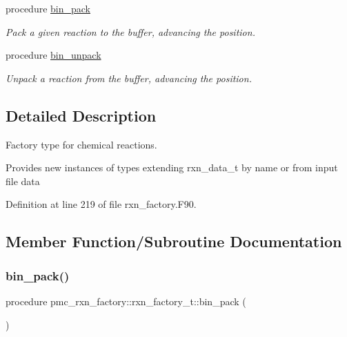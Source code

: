 \begin{DoxyCompactItemize}
procedure \mbox{\hyperlink{structpmc__rxn__factory_1_1rxn__factory__t_a72960f541acc00590ddd21511df66604}{bin\+\_\+pack}}
\begin{DoxyCompactList}\small\item\em Pack a given reaction to the buffer, advancing the position. \end{DoxyCompactList}\item 
procedure \mbox{\hyperlink{structpmc__rxn__factory_1_1rxn__factory__t_a01d9107ebd48bf470251492502354405}{bin\+\_\+unpack}}
\begin{DoxyCompactList}\small\item\em Unpack a reaction from the buffer, advancing the position. \end{DoxyCompactList}\end{DoxyCompactItemize}


\subsection{Detailed Description}
Factory type for chemical reactions. 

Provides new instances of types extending rxn\+\_\+data\+\_\+t by name or from input file data 

Definition at line 219 of file rxn\+\_\+factory.\+F90.



\subsection{Member Function/\+Subroutine Documentation}
\mbox{\label{structpmc__rxn__factory_1_1rxn__factory__t_a72960f541acc00590ddd21511df66604}} 
\subsubsection{\texorpdfstring{bin\+\_\+pack()}{bin\_pack()}}
{\footnotesize\ttfamily procedure pmc\+\_\+rxn\+\_\+factory\+::rxn\+\_\+factory\+\_\+t\+::bin\+\_\+pack (\begin{DoxyParamCaption}{ }\end{DoxyParamCaption})\hspace{0.3cm}{\ttfamily [private]}}



